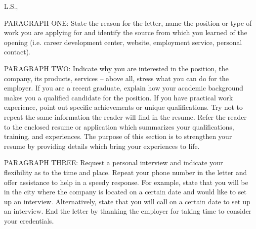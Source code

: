 \documentclass[10pt,a4paper]{../altacv}
\begin{document}

\begin{fullwidth}
\makecvheader



		\vspace{1cm} %



\begin{changemargin}{2cm}{2cm}

\bigskip
\bigskip

L.S.,

\bigskip

PARAGRAPH ONE: State the reason for the letter, name the position or type of work you are applying for and identify the source from which you learned of the opening (i.e. career development center, website, employment service, personal contact).

\bigskip

PARAGRAPH TWO: Indicate why you are interested in the position, the company, its products, services -- above all, stress what you can do for the employer. If you are a recent graduate, explain how your academic background makes you a qualified candidate for the position. If you have practical work experience, point out specific achievements or unique qualifications. Try not to repeat the same information the reader will find in the resume. Refer the reader to the enclosed resume or application which summarizes your qualifications, training, and experiences. The purpose of this section is to strengthen your resume by providing details which bring your experiences to life.

\bigskip

PARAGRAPH THREE: Request a personal interview and indicate your flexibility as to the time and place. Repeat your phone number in the letter and offer assistance to help in a speedy response. For example, state that you will be in the city where the company is located on a certain date and would like to set up an interview. Alternatively, state that you will call on a certain date to set up an interview. End the letter by thanking the employer for taking time to consider your credentials.


\end{changemargin}
\end{fullwidth}
\end{document}
